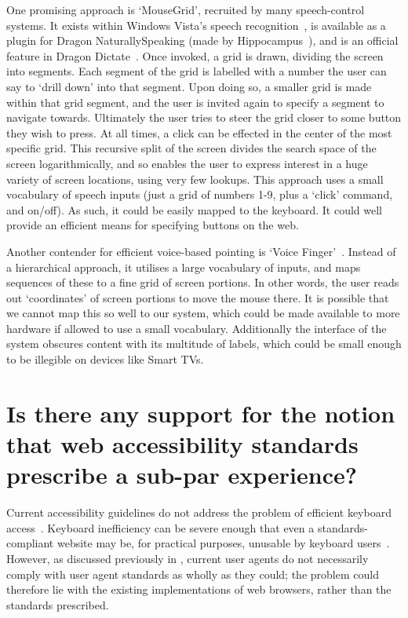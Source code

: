 \documentclass[11pt,openright,a4paper]{report}
\begin{document}
One promising approach is `MouseGrid', recruited by many speech-control systems. It exists within Windows Vista's speech recognition~\cite{vistamousegrid}, is available as a plugin for Dragon NaturallySpeaking (made by Hippocampus~\cite{hippogrid}), and is an official feature in Dragon Dictate~\cite{nuancegrid}. Once invoked, a grid is drawn, dividing the screen into segments. Each segment of the grid is labelled with a number the user can say to `drill down' into that segment. Upon doing so, a smaller grid is made within that grid segment, and the user is invited again to specify a segment to navigate towards. Ultimately the user tries to steer the grid closer to some button they wish to press.
At all times, a click can be effected in the center of the most specific grid. This recursive split of the screen divides the search space of the screen logarithmically, and so enables the user to express interest in a huge variety of screen locations, using very few lookups.
This approach uses a small vocabulary of speech inputs (just a grid of numbers 1-9, plus a `click' command, and on/off). As such, it could be easily mapped to the keyboard. It could well provide an efficient means for specifying buttons on the web.

Another contender for efficient voice-based pointing is `Voice Finger'~\cite{voicefinger}. Instead of a hierarchical approach, it utilises a large vocabulary of inputs, and maps sequences of these to a fine grid of screen portions. In other words, the user reads out `coordinates' of screen portions to move the mouse there. It is possible that we cannot map this so well to our system, which could be made available to more hardware if allowed to use a small vocabulary. Additionally the interface of the system obscures content with its multitude of labels, which could be small enough to be illegible on devices like Smart TVs.
\section{Is there any support for the notion that web accessibility standards prescribe a sub-par experience?}
\label{subparstandards}
Current accessibility guidelines do not address the problem of efficient keyboard access~\cite{schrepp2006efficiency}. Keyboard inefficiency can be severe enough that even a standards-compliant website may be, for practical purposes, unusable by keyboard users~\cite{schrepp2006efficiency,coyne2001beyond,powlik2002accessibility}. However, as discussed previously in , current user agents do not necessarily comply with user agent standards as wholly as they could; the problem could therefore lie with the existing implementations of web browsers, rather than the standards prescribed.
\end{document}
